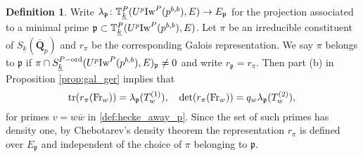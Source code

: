 \documentclass[leqno]{amsart}
\theoremstyle{definition}
\newtheorem{defn}[thm]{Definition}
\theoremstyle{remark}
\newcommand{\Q}{{\mathbf{Q}}}
\DeclareMathOperator{\mtr}{tr}
\newcommand{\Fr}{\textnormal{Fr}} %
\newcommand{\fp}{\mathfrak{p}}
\newcommand{\bw}{{\overline{w}}}
\newcommand{\wt}[1]{\underline{ #1 }}
\newcommand{\Iw}{\textnormal{Iw}} %
\newcommand{\TT}{\mathbb{T}} %
\newcommand{\ord}{\textnormal{ord}} %
\begin{document}
\begin{defn}\label{def:rep_prime}
	Write 
	$\lambda_\fp\colon \TT^P_{\wt{k}}(U^p\Iw^P(p^{b,b}),E)\to E_\fp$
    for the projection associated 
    to a minimal prime $\fp\subset \TT^P_{\wt{k}}(U^p\Iw^P(p^{b,b}),E)$.
    Let $\pi$ be an irreducible constituent 
    of $S_{\wt{k}}(\bar{\Q}_p)$
    and $r_\pi$ be the corresponding Galois representation.
    We say $\pi$ belongs to $\fp$ if
	$\pi\cap S_{\wt{k}}^{P-\ord}(U^p\Iw^P(p^{b,b}),E)_{\fp}\neq 0$
    and write $r_\fp=r_\pi$.
    Then part (b) in Proposition \ref{prop:gal_ger} implies that
	\begin{equation}\label{eq:Gal_hecke_away_p}
		\mtr(r_\pi(\Fr_w))=\lambda_\fp(T_w^{(1)}),\quad
		\det(r_\pi(\Fr_w))=q_w\lambda_\fp(T_w^{(2)}),\,
	\end{equation}
	for primes $v=w\bw$ in \eqref{def:hecke_away_p}.
    Since the set of such primes has density one,
	by Chebotarev's density theorem
	the representation $r_\pi$ is defined over $E_{\fp}$
	and independent of the choice of $\pi$ belonging to $\fp$.
\end{defn}
\end{document}
